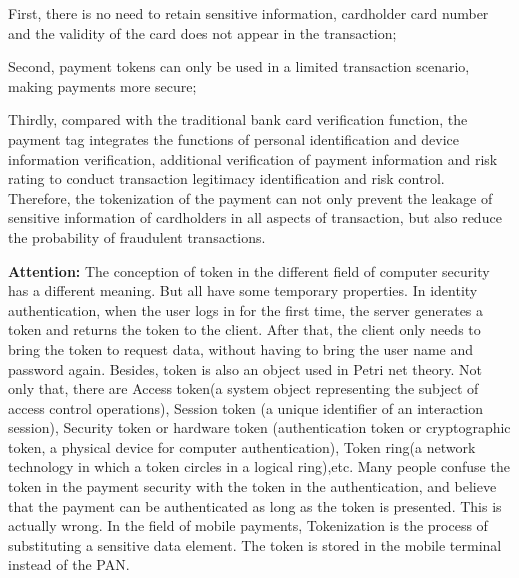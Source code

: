 \documentclass[journal]{IEEEtran}
\begin{document}
First, there is no need to retain sensitive information, cardholder card number and the validity of the card does not appear in the transaction;

Second, payment tokens can only be used in a limited transaction scenario, making payments more secure;

Thirdly, compared with the traditional bank card verification function, the payment tag integrates the functions of personal identification and device information verification, additional verification of payment information and risk rating to conduct transaction legitimacy identification and risk control. Therefore, the tokenization of the payment can not only prevent the leakage of sensitive information of cardholders in all aspects of transaction, but also reduce the probability of fraudulent transactions.

\textbf{Attention:} The conception of token in the different field of computer security has a different meaning. But all have some temporary properties. In identity authentication, when the user logs in for the first time, the server generates a token and returns the token to the client. After that, the client only needs to bring the token to request data, without having to bring the user name and password again. Besides, token is also an object used in Petri net theory. Not only that, there are Access token(a system object representing the subject of access control operations), Session token (a unique identifier of an interaction session), Security token or hardware token (authentication token or cryptographic token, a physical device for computer authentication), Token ring(a network technology in which a token circles in a logical ring),etc. Many people confuse the token in the payment security with the token in the authentication, and believe that the payment can be authenticated as long as the token is presented. This is actually wrong. In the field of mobile payments, Tokenization is the process of substituting a sensitive data element. The token is stored in the mobile terminal instead of the PAN.
\end{document}
